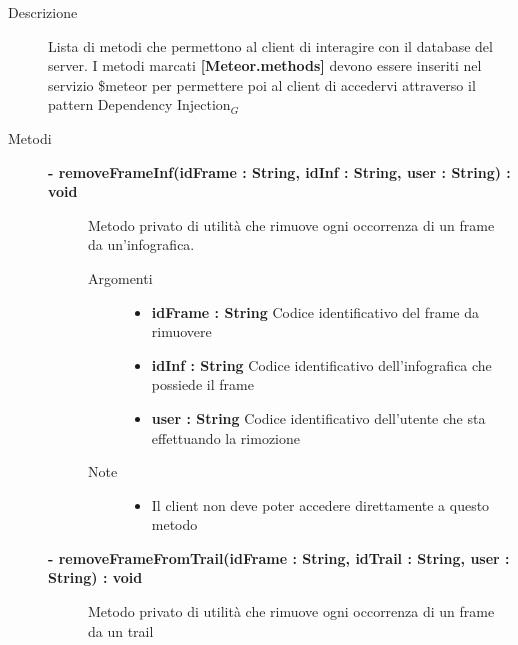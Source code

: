 \begin{description}
\item[Descrizione] \hfill
	Lista di metodi che permettono al client di interagire con il database del server. I metodi marcati \textbf{[Meteor.methods]} devono essere inseriti nel servizio \$meteor per permettere poi al client di accedervi attraverso il pattern Dependency Injection$_G$






\item[Metodi] \hfill

	\begin{description}
		\item[\textbf{\color{blue}- removeFrameInf(idFrame : String, idInf : String, user : String) : void			}] \hfill
			Metodo privato di utilità che rimuove ogni occorrenza di un frame da un'infografica.
			
		\begin{description}
			\item[Argomenti] \hfill
				\begin{itemize}
				
					\item \textbf{idFrame : String			} \hfill
					Codice identificativo del frame da rimuovere
					\item \textbf{idInf : String		} \hfill
					Codice identificativo dell'infografica che possiede il frame
					\item \textbf{user : String			} \hfill
					Codice identificativo dell'utente che sta effettuando la rimozione
					
				\end{itemize}
			\item[Note] \hfill
			\begin{itemize}
					\item Il client non deve poter accedere direttamente a questo metodo
				\end{itemize}
		\end{description}
	\end{description}
	
	\begin{description}
		\item[\textbf{\color{blue}- removeFrameFromTrail(idFrame : String, idTrail : String, user :  String)	: void		}] \hfill
			Metodo privato di utilità che rimuove ogni occorrenza di un frame da un trail
			

\end{description}
\end{description}
